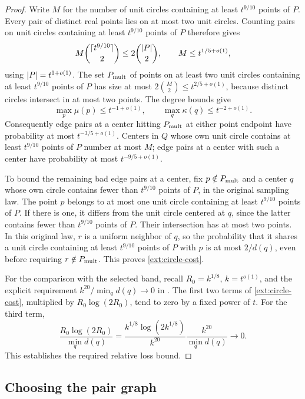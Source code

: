 \begin{proof}
Write \(M\) for the number of unit circles containing at least \(t^{9/10}\) points of \(P\).  Every pair of distinct
real points lies on at most two unit circles.  Counting pairs on unit circles containing at least \(t^{9/10}\) points of \(P\) therefore gives
\[
 M\binom{\lceil t^{9/10}\rceil}{2}
 \le2\binom{\lvert P\rvert}{2},\qquad M\le t^{1/5+o(1)},
\]
using \(\lvert P\rvert=t^{1+o(1)}\).
The set \(P_{\rm mult}\) of points on at least two unit circles containing at least \(t^{9/10}\) points of \(P\) has
size at most \(2\binom M2\le t^{2/5+o(1)}\), because distinct circles
intersect in at most two points.  The degree bounds give
\[
 \max_p\mu(p)\le t^{-1+o(1)},\qquad
 \max_q\kappa(q)\le t^{-2+o(1)}.
\]
Consequently edge pairs at a center hitting \(P_{\rm mult}\) at either point endpoint
have probability at most \(t^{-3/5+o(1)}\).  Centers in \(Q\) whose
own unit circle contains at least \(t^{9/10}\) points of \(P\) number at most \(M\); edge pairs at a center with such a
center have probability at most \(t^{-9/5+o(1)}\).

To bound the remaining bad edge pairs at a center, fix \(p\notin P_{\rm mult}\) and
a center \(q\) whose own circle contains fewer than \(t^{9/10}\) points of \(P\), in the original sampling
law.  The point \(p\) belongs to at most one unit circle containing at least \(t^{9/10}\) points of \(P\).  If there is
one, it differs from the unit circle centered at \(q\), since the
latter contains fewer than \(t^{9/10}\) points of \(P\).  Their intersection has at most two points.
In this original law, \(r\) is a uniform neighbor of \(q\), so the
probability that it shares a unit circle containing at least \(t^{9/10}\) points of \(P\) with \(p\) is at most
\(2/d(q)\), even before requiring \(r\notin P_{\rm mult}\).
This proves \eqref{ext:circle-cost}.

For the comparison with the selected band, recall
\(R_0=k^{1/8}\), \(k=t^{o(1)}\), and the explicit requirement
\(k^{20}/\min_qd(q)\to0\) in .
The first two terms of \eqref{ext:circle-cost}, multiplied by
\(R_0\log(2R_0)\), tend to zero by a fixed power of \(t\).
For the third term,
\[
 \frac{R_0\log(2R_0)}{\min_qd(q)}
 =\frac{k^{1/8}\log(2k^{1/8})}{k^{20}}
                  \frac{k^{20}}{\min_qd(q)}\longrightarrow0.
\]
This establishes the required relative loss bound.
\end{proof}

\subsection{Choosing the pair graph}\label{sec:pairs-proof}

